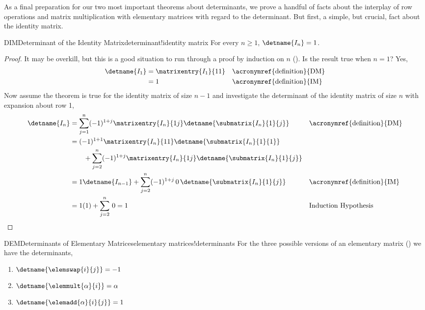 %
%
As a final preparation for our two most important theorems about determinants, we prove a handful of facts about the interplay of row operations and matrix multiplication with elementary matrices with regard to the determinant.  But first, a simple, but crucial, fact about the identity matrix.
%
%
\begin{theorem}{DIM}{Determinant of the Identity Matrix}{determinant!identity matrix}
For every $n\geq 1$, $\detname{I_n}=1$.
\end{theorem}
%
\begin{proof}
It may be overkill, but this is a good situation to run through a proof by induction on $n$ ().  Is the result true when $n=1$? Yes,
%
\begin{align*}
\detname{I_1}
&=\matrixentry{I_1}{11}&&\text{\acronymref{definition}{DM}}\\
%
&=1&&\text{\acronymref{definition}{IM}}\\
%
\end{align*}
%
Now assume the theorem is true for the identity matrix of size $n-1$ and investigate the determinant of the identity matrix of size $n$ with expansion about row 1,
%
\begin{align*}
\detname{I_n}
&=
\sum_{j=1}^{n}(-1)^{1+j}\matrixentry{I_n}{1j}\detname{\submatrix{I_n}{1}{j}}
&&\text{\acronymref{definition}{DM}}\\
%
&=
(-1)^{1+1}\matrixentry{I_n}{11}\detname{\submatrix{I_n}{1}{1}}\\
&\quad\quad+
\sum_{j=2}^{n}(-1)^{1+j}\matrixentry{I_n}{1j}\detname{\submatrix{I_n}{1}{j}}\\
%
&=
1\detname{I_{n-1}}+
\sum_{j=2}^{n}(-1)^{1+j}\,0\,\detname{\submatrix{I_n}{1}{j}}
&&\text{\acronymref{definition}{IM}}\\
%
&=
1(1)+\sum_{j=2}^{n}\,0=1
&&\text{Induction Hypothesis}\\
\end{align*}
%
\end{proof}
%
%
\begin{theorem}{DEM}{Determinants of Elementary Matrices}{elementary matrices!determinants}
For the three possible versions of an elementary matrix () we have the determinants,
\begin{enumerate}
\item $\detname{\elemswap{i}{j}}=-1$
\item $\detname{\elemmult{\alpha}{i}}=\alpha$
\item $\detname{\elemadd{\alpha}{i}{j}}=1$
\end{enumerate}
\end{theorem}
